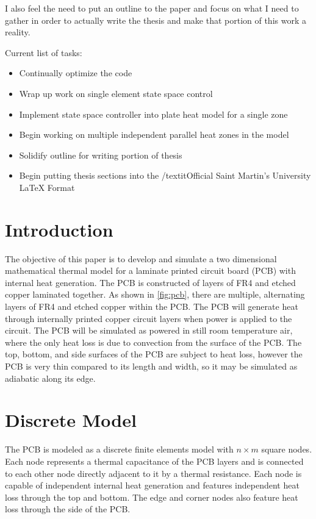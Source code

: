 \documentclass[10pt,twocolumn]{article}
\begin{document}
I also feel the need to put an outline to the paper and focus on what I need to gather in order to actually write the thesis and make that portion of this work a reality.

Current list of tasks:
\begin{itemize}
	\item Continually optimize the code
	\item Wrap up work on single element state space control
	\item Implement state space controller into plate heat model for a single zone
	\item Begin working on multiple independent parallel heat zones in the model
	\item Solidify outline for writing portion of thesis
	\item Begin putting thesis sections into the /textit{Official Saint Martin's University LaTeX Format}
\end{itemize}


\section{Introduction}
The objective of this paper is to develop and simulate a two dimensional mathematical thermal model for a laminate printed circuit board (PCB) with internal heat generation. The PCB is constructed of layers of FR4 and etched copper laminated together. As shown in \autoref{fig:pcb}, there are multiple, alternating layers of FR4 and etched copper within the PCB. The PCB will generate heat through internally printed copper circuit layers when power is applied to the circuit. The PCB will be simulated as powered in still room temperature air, where the only heat loss is due to convection from the surface of the PCB. The top, bottom, and side surfaces of the PCB are subject to heat loss, however the PCB is very thin compared to its length and width, so it may be simulated as adiabatic along its edge.

\section{Discrete Model}
The PCB is modeled as a discrete finite elements model with $n \times m$ square nodes. Each node represents a thermal capacitance of the PCB layers and is connected to each other node directly adjacent to it by a thermal resistance. Each node is capable of independent internal heat generation and features independent heat loss through the top and bottom. The edge and corner nodes also feature heat loss through the side of the PCB.
\end{document}

